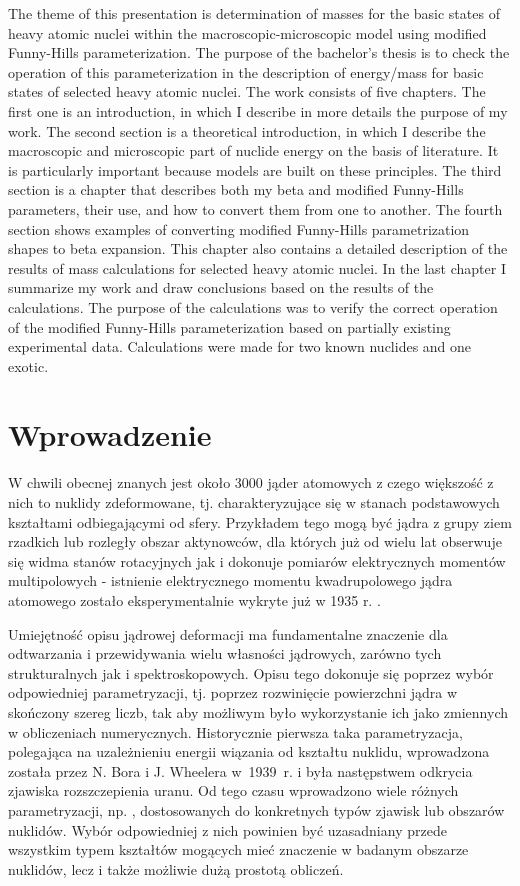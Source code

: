 \documentclass[a4paper,polish]{article}
\numberwithin{equation}{section}
\begin{document}
The theme of this presentation is determination of masses for the basic states of heavy atomic nuclei within the macroscopic-microscopic model using modified Funny-Hills parameterization. The purpose of the bachelor's thesis is to check the operation of this parameterization in the description of energy/mass for basic states of selected heavy atomic nuclei. The work consists of five chapters. The first one is an introduction, in which I describe in more details the purpose of my work. The second section is a theoretical introduction, in which I describe the macroscopic and microscopic part of nuclide energy on the basis of literature. It is particularly important because models are built on these principles. The third section is a chapter that describes both my beta and modified Funny-Hills parameters, their use, and how to convert them from one to another. The fourth section shows examples of converting modified Funny-Hills parametrization shapes to beta expansion. This chapter also contains a detailed description of the results of mass calculations for selected heavy atomic nuclei. In the last chapter I summarize my work and draw conclusions based on the results of the calculations. The purpose of the calculations was to verify the correct operation of the modified Funny-Hills parameterization based on partially existing experimental data. Calculations were made for two known nuclides and one exotic.

\clearpage
\section{Wprowadzenie}

W chwili obecnej znanych jest około 3000 jąder atomowych z czego większość z nich to nuklidy zdeformowane, tj. charakteryzujące się w stanach podstawowych kształtami odbiegającymi od sfery. Przykładem tego mogą być jądra z grupy ziem rzadkich lub rozległy obszar aktynowców, dla których już od wielu lat obserwuje się widma stanów rotacyjnych  jak i dokonuje pomiarów elektrycznych momentów multipolowych - istnienie elektrycznego momentu kwadrupolowego jądra atomowego zostało eksperymentalnie wykryte już w 1935 r. \cite{1935}.

Umiejętność opisu jądrowej deformacji ma fundamentalne znaczenie dla odtwarzania i przewidywania wielu własności jądrowych, zarówno tych strukturalnych jak i spektroskopowych. Opisu tego dokonuje się poprzez wybór odpowiedniej parametryzacji, tj. poprzez rozwinięcie powierzchni jądra w skończony szereg liczb, tak aby możliwym było wykorzystanie ich jako zmiennych w obliczeniach numerycznych. Historycznie pierwsza taka parametryzacja, polegająca na uzależnieniu energii wiązania od kształtu nuklidu, wprowadzona została przez N. Bora i J. Wheelera w~1939~r. \cite{1939} i była następstwem odkrycia zjawiska rozszczepienia uranu. Od tego czasu wprowadzono wiele różnych parametryzacji, np. \cite{parametryzacje}, dostosowanych do konkretnych typów zjawisk lub obszarów nuklidów. Wybór odpowiedniej z nich powinien być uzasadniany przede wszystkim typem kształtów mogących mieć znaczenie w badanym obszarze nuklidów, lecz i także możliwie dużą prostotą obliczeń.
\end{document}
